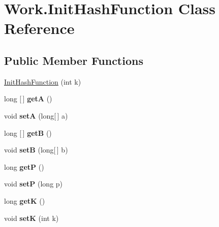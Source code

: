 \hypertarget{classWork_1_1InitHashFunction}{}\section{Work.\+Init\+Hash\+Function Class Reference}
\label{classWork_1_1InitHashFunction}
\subsection*{Public Member Functions}
\begin{DoxyCompactItemize}
\item 
\hyperlink{classWork_1_1InitHashFunction_a566c4124d9c94ca4a2afc714c1d92eac}{Init\+Hash\+Function} (int k)
\item 
\mbox{\label{classWork_1_1InitHashFunction_afd555175afbf59564245a62f9ba8d48c}} 
long \mbox{[}$\,$\mbox{]} {\bfseries getA} ()
\item 
\mbox{\label{classWork_1_1InitHashFunction_a33cdad12721594282d33f6a66afcb411}} 
void {\bfseries setA} (long\mbox{[}$\,$\mbox{]} a)
\item 
\mbox{\label{classWork_1_1InitHashFunction_ad06c00d726ae3865c7744e88e9f19de4}} 
long \mbox{[}$\,$\mbox{]} {\bfseries getB} ()
\item 
\mbox{\label{classWork_1_1InitHashFunction_a11d3a4ab052e1b31bc8b023d57235d31}} 
void {\bfseries setB} (long\mbox{[}$\,$\mbox{]} b)
\item 
\mbox{\label{classWork_1_1InitHashFunction_a7a4efd79a8fe49e262fa1151d29f8f73}} 
long {\bfseries getP} ()
\item 
\mbox{\label{classWork_1_1InitHashFunction_aaf200958f11688b62f87b3e469d9b1dd}} 
void {\bfseries setP} (long p)
\item 
\mbox{\label{classWork_1_1InitHashFunction_a3d7a23b68bb962eaabc930134715a2eb}} 
long {\bfseries getK} ()
\item 
\mbox{\label{classWork_1_1InitHashFunction_a20f5b18fdeb7d9753bcc418ba7163f00}} 
void {\bfseries setK} (int k)
\end{DoxyCompactItemize}


